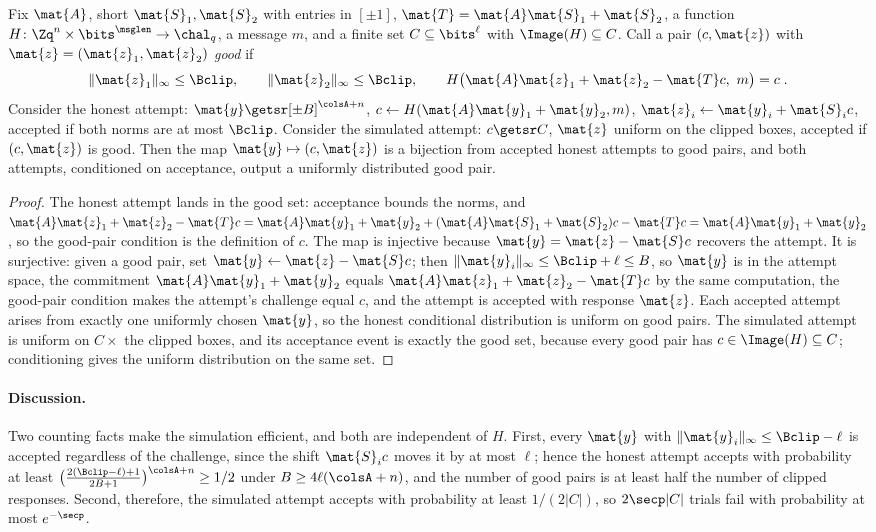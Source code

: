 \begin{lemma} \label{lem-dil-sim}
Fix $\mat{A}$, short $\mat{S}_1,\mat{S}_2$ with entries in $[\pm1]$, $\mat{T}=\mat{A}\mat{S}_1+\mat{S}_2$, a function $H \colon \Zq^n \times \bits^{\msglen} \to \chal_q$, a message $m$, and a finite set $C \subseteq \bits^{\ell}$ with $\Image(H) \subseteq C$. Call a pair $(c,\mat{z})$ with $\mat{z}=(\mat{z}_1,\mat{z}_2)$ \emph{good} if
$$
\|\mat{z}_1\|_\infty \le \Bclip,
\qquad
\|\mat{z}_2\|_\infty \le \Bclip,
\qquad
H\big(\mat{A}\mat{z}_1+\mat{z}_2-\mat{T}c,\ m\big)=c \;.
$$
Consider the honest attempt: $\mat{y} \getsr [\pm B]^{\colsA+n}$, $c \gets H(\mat{A}\mat{y}_1+\mat{y}_2, m)$, $\mat{z}_i \gets \mat{y}_i+\mat{S}_ic$, accepted if both norms are at most $\Bclip$. Consider the simulated attempt: $c \getsr C$, $\mat{z}$ uniform on the clipped boxes, accepted if $(c,\mat{z})$ is good. Then the map $\mat{y} \mapsto (c,\mat{z})$ is a bijection from accepted honest attempts to good pairs, and both attempts, conditioned on acceptance, output a uniformly distributed good pair.
\end{lemma}

\begin{proof}
The honest attempt lands in the good set: acceptance bounds the norms, and $\mat{A}\mat{z}_1+\mat{z}_2-\mat{T}c = \mat{A}\mat{y}_1+\mat{y}_2 + (\mat{A}\mat{S}_1+\mat{S}_2)c - \mat{T}c = \mat{A}\mat{y}_1+\mat{y}_2$, so the good-pair condition is the definition of $c$. The map is injective because $\mat{y} = \mat{z}-\mat{S}c$ recovers the attempt. It is surjective: given a good pair, set $\mat{y} \gets \mat{z}-\mat{S}c$; then $\|\mat{y}_i\|_\infty \le \Bclip + \ell \le B$, so $\mat{y}$ is in the attempt space, the commitment $\mat{A}\mat{y}_1+\mat{y}_2$ equals $\mat{A}\mat{z}_1+\mat{z}_2-\mat{T}c$ by the same computation, the good-pair condition makes the attempt's challenge equal $c$, and the attempt is accepted with response $\mat{z}$. Each accepted attempt arises from exactly one uniformly chosen $\mat{y}$, so the honest conditional distribution is uniform on good pairs. The simulated attempt is uniform on $C \times$ the clipped boxes, and its acceptance event is exactly the good set, because every good pair has $c \in \Image(H) \subseteq C$; conditioning gives the uniform distribution on the same set.
\end{proof}

\paragraph*{Discussion.} Two counting facts make the simulation efficient, and both are independent of $H$. First, every $\mat{y}$ with $\|\mat{y}_i\|_\infty \le \Bclip-\ell$ is accepted regardless of the challenge, since the shift $\mat{S}_ic$ moves it by at most $\ell$; hence the honest attempt accepts with probability at least $\big(\tfrac{2(\Bclip-\ell)+1}{2B+1}\big)^{\colsA+n} \ge 1/2$ under $B \ge 4\ell(\colsA+n)$, and the number of good pairs is at least half the number of clipped responses. Second, therefore, the simulated attempt accepts with probability at least $1/(2|C|)$, so $2\secp|C|$ trials fail with probability at most $e^{-\secp}$.

